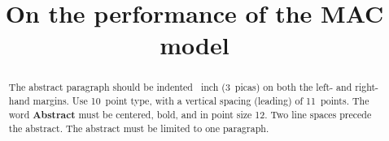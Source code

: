 \documentclass{article}
\title{On the performance of the MAC model}
\author{}
\theoremstyle{remark}
\begin{document}

\maketitle

\begin{abstract}
  The abstract paragraph should be indented ~inch
  (3~picas) on both the left- and right-hand margins. Use 10~point
  type, with a vertical spacing (leading) of 11~points.  The word
  \textbf{Abstract} must be centered, bold, and in point size 12. Two
  line spaces precede the abstract. The abstract must be limited to
  one paragraph.
\end{abstract}








\end{document}

